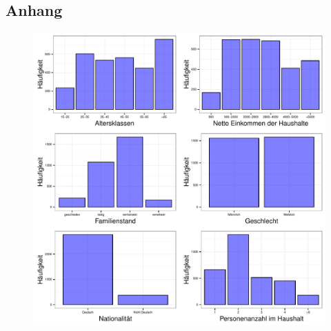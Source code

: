 \documentclass{Vorlage}
\begin{document}
\clearpage


\begin{appendix}

\section*{Anhang}






\begin{figure}[h]
 \begin{center}
 \includegraphics[scale=0.8]{Pictures/BarData}
 \end{center}
\end{figure}



\end{appendix}
\end{document}
